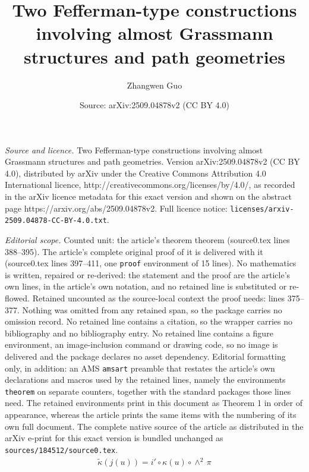 \documentclass[10pt,a4paper]{amsart}
\title{Two Fefferman-type constructions involving almost Grassmann structures and path geometries}
\author{Zhangwen Guo}
\date{Source: arXiv:2509.04878v2 (CC BY 4.0)}
\newtheorem{theorem}{Theorem}
\begin{document}
\maketitle

\noindent\emph{Source and licence.} Two Fefferman-type constructions involving almost Grassmann structures and path geometries. Version arXiv:2509.04878v2 (CC BY 4.0), distributed by arXiv under the Creative Commons Attribution 4.0 International licence, http://creativecommons.org/licenses/by/4.0/, as recorded in the arXiv licence metadata for this exact version and shown on the abstract page https://arxiv.org/abs/2509.04878v2. Full licence notice: \texttt{licenses/arxiv-2509.04878-CC-BY-4.0.txt}.\par\smallskip

\noindent\textit{Editorial scope.} Counted unit: the article's theorem theorem (source0.tex lines 388--395). The article's complete original proof of it is delivered with it (source0.tex lines 397--411, one \texttt{proof} environment of 15 lines). No mathematics is written, repaired or re-derived: the statement and the proof are the article's own lines, in the article's own notation, and no retained line is substituted or re-flowed.  Retained uncounted as the source-local context the proof needs: lines 375--377.  Nothing was omitted from any retained span, so the package carries no omission record.  No retained line contains a citation, so the wrapper carries no bibliography and no bibliography entry.  No retained line contains a figure environment, an image-inclusion command or drawing code, so no image is delivered and the package declares no asset dependency.  Editorial formatting only, in addition: an AMS \texttt{amsart} preamble that restates the article's own declarations and macros used by the retained lines, namely the environments \texttt{theorem} on separate counters, together with the standard packages those lines need.  The retained environments print in this document as Theorem 1 in order of appearance, whereas the article prints the same items with the numbering of its own full document.  The complete native source of the article as distributed in the arXiv e-print for this exact version is bundled unchanged as \texttt{sources/184512/source0.tex}.
\begin{align}\label{tilde kappa}
    \tilde\kappa(j(u))=i'\circ\kappa(u)\circ\wedge^2\, \pi
\end{align}

\end{document}
